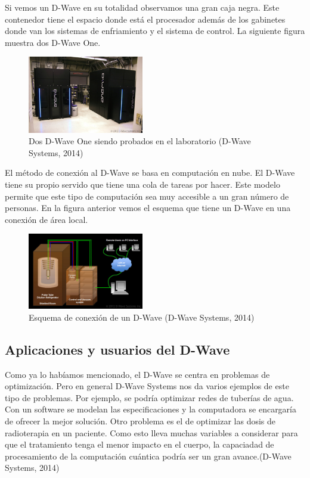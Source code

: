 \documentclass[11pt,a4paper]{article}
\begin{document}
Si vemos un D-Wave en su totalidad observamos una gran caja negra. Este contenedor tiene el espacio donde está el procesador además de los gabinetes donde van los sistemas de enfriamiento y el sistema de control. La siguiente figura muestra dos D-Wave One.
\clearpage
\begin{figure}
\centering
\includegraphics[width=0.45\textwidth]{dwave}
\caption{Dos D-Wave One siendo probados en el laboratorio (D-Wave Systems, 2014)}
\end{figure}

El método de conexión al D-Wave se basa en computación en nube. El D-Wave tiene su propio servido que tiene una cola de tareas por hacer. Este modelo permite que este tipo de computación sea muy accesible a un gran número de personas. En la figura anterior vemos el esquema que tiene un D-Wave en una conexión de área local.

\begin{figure}
\centering
\includegraphics[width=0.45\textwidth]{esquema}
\caption{Esquema de conexión de un D-Wave (D-Wave Systems, 2014)}
\end{figure}

\clearpage
\subsection*{Aplicaciones y usuarios del D-Wave}
Como ya lo habíamos mencionado, el D-Wave se centra en problemas de optimización. Pero en general D-Wave Systems nos da varios ejemplos de este tipo de problemas. Por ejemplo, se podría optimizar redes de tuberías de agua. Con un software se modelan las especificaciones y la computadora se encargaría de ofrecer la mejor solución. Otro problema es el de optimizar las dosis de radioterapia en un paciente. Como esto lleva muchas variables a considerar para que el tratamiento tenga el menor impacto en el cuerpo, la capaciadad de procesamiento de la computación cuántica podría ser un gran avance.(D-Wave Systems, 2014)
\end{document}
